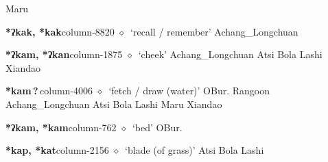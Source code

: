 \hspace{1ex}
         Maru 
  \item {\footnotesize \textbf{*ʔkak, *kak}}{\tiny column-8820}
         $\diamond$~`recall / remember'
         Achang\_Longchuan 
  \item {\footnotesize \textbf{*ʔkam, *ʔkan}}{\tiny column-1875}
         $\diamond$~`cheek'
         Achang\_Longchuan 
\hspace{1ex}
         Atsi 
\hspace{1ex}
         Bola 
\hspace{1ex}
         Lashi 
\hspace{1ex}
         Xiandao 
  \item {\footnotesize \textbf{*kam\,?\,}}{\tiny column-4006}
         $\diamond$~`fetch / draw (water)'
         OBur. 
\hspace{1ex}
         Rangoon 
\hspace{1ex}
         Achang\_Longchuan 
\hspace{1ex}
         Atsi 
\hspace{1ex}
         Bola 
\hspace{1ex}
         Lashi 
\hspace{1ex}
         Maru 
\hspace{1ex}
         Xiandao 
  \item {\footnotesize \textbf{*ʔkam, *kam}}{\tiny column-762}
         $\diamond$~`bed'
         OBur. 
  \item {\footnotesize \textbf{*kap, *kat}}{\tiny column-2156}
         $\diamond$~`blade (of grass)'
         Atsi 
\hspace{1ex}
         Bola 
\hspace{1ex}
         Lashi 
\hspace{1ex}
